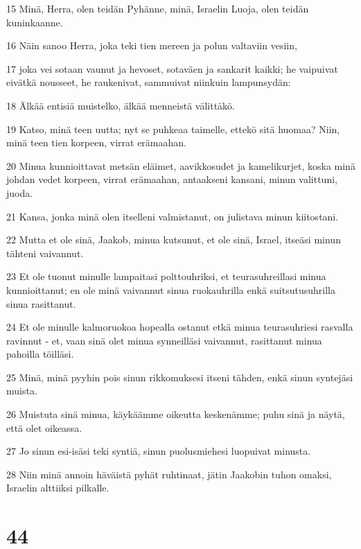 \par 15 Minä, Herra, olen teidän Pyhänne, minä, Israelin Luoja, olen teidän kuninkaanne.
\par 16 Näin sanoo Herra, joka teki tien mereen ja polun valtaviin vesiin,
\par 17 joka vei sotaan vaunut ja hevoset, sotaväen ja sankarit kaikki; he vaipuivat eivätkä nousseet, he raukenivat, sammuivat niinkuin lampunsydän:
\par 18 Älkää entisiä muistelko, älkää menneistä välittäkö.
\par 19 Katso, minä teen uutta; nyt se puhkeaa taimelle, ettekö sitä huomaa? Niin, minä teen tien korpeen, virrat erämaahan.
\par 20 Minua kunnioittavat metsän eläimet, aavikkosudet ja kamelikurjet, koska minä johdan vedet korpeen, virrat erämaahan, antaakseni kansani, minun valittuni, juoda.
\par 21 Kansa, jonka minä olen itselleni valmistanut, on julistava minun kiitostani.
\par 22 Mutta et ole sinä, Jaakob, minua kutsunut, et ole sinä, Israel, itseäsi minun tähteni vaivannut.
\par 23 Et ole tuonut minulle lampaitasi polttouhriksi, et teurasuhreillasi minua kunnioittanut; en ole minä vaivannut sinua ruokauhrilla enkä suitsutusuhrilla sinua rasittanut.
\par 24 Et ole minulle kalmoruokoa hopealla ostanut etkä minua teurasuhriesi rasvalla ravinnut - et, vaan sinä olet minua synneilläsi vaivannut, rasittanut minua pahoilla töilläsi.
\par 25 Minä, minä pyyhin pois sinun rikkomuksesi itseni tähden, enkä sinun syntejäsi muista.
\par 26 Muistuta sinä minua, käykäämme oikeutta keskenämme; puhu sinä ja näytä, että olet oikeassa.
\par 27 Jo sinun esi-isäsi teki syntiä, sinun puolusmiehesi luopuivat minusta.
\par 28 Niin minä annoin häväistä pyhät ruhtinaat, jätin Jaakobin tuhon omaksi, Israelin alttiiksi pilkalle.

\chapter{44}

